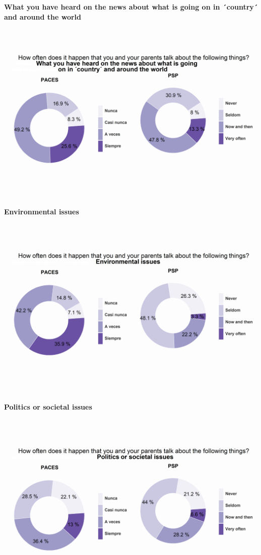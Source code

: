 \documentclass[12pt,twoside]{templates/facsothesis}
\begin{document}
\textbf{What you have heard on the news about what is going on in ´country´ and around the world}

\includegraphics{output/plotdiscpar1.png}

\textbf{Environmental issues}

\includegraphics{output/plotdiscpar2.png}

\textbf{Politics or societal issues}

\includegraphics{output/plotdiscpar3.png}
\end{document}
